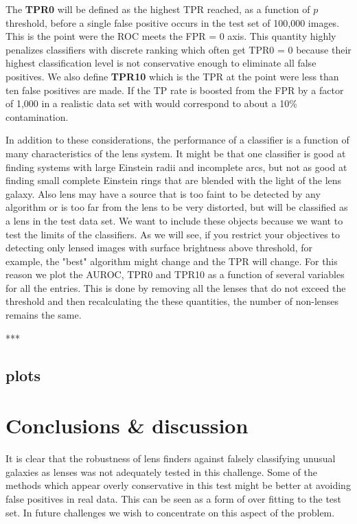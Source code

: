\documentclass[useAMS,usenatbib]{mn2e}
\begin{document}
The {\bf TPR0} will be defined as the highest TPR reached, as a function of $p$ threshold, before a single false positive occurs in the test set of 100,000 images.  This is the point were the ROC meets the FPR = 0 axis.  This quantity highly penalizes classifiers with discrete ranking which often get TPR0 = 0 because their highest classification level is not conservative enough to eliminate all false positives.  We also define {\bf TPR10} which is the TPR at the point were less than ten false positives are made.  If the TP 
rate is boosted from the FPR by a factor of 1,000 in a realistic data set with would correspond to about a 10\% contamination.

In addition to these considerations, the performance of a classifier is a function of many characteristics of the lens system.  It might be that one classifier is good at finding systems with large Einstein radii and incomplete arcs, but not as good at finding small complete Einstein rings that are blended with the light of the lens galaxy.  Also lens may have a source that is too faint to be detected by any algorithm or is too far from the lens to be very distorted, but will be classified as a lens in the test data set.   We want to include these objects because we want to test the limits of the classifiers.  As we will see, if you restrict your objectives to detecting only lensed images with surface brightness above threshold, for example, the "best" algorithm might change and the TPR will change.  For this reason we plot the AUROC, TPR0 and TPR10 as a function of several variables for all the entries.  This is done by removing all the lenses that do not exceed the threshold and then recalculating the these quantities, the number of non-lenses remains the same.

***
\subsection{plots}


\section{Conclusions \& discussion}

It is clear that the robustness of lens finders against falsely classifying unusual galaxies as lenses was not adequately tested in this challenge.  Some of the methods which appear overly conservative in this test might be better at avoiding false positives in real data.  This can be seen as a form of over fitting to the test set.
In future challenges we wish to concentrate on this aspect of the problem.
\end{document}
